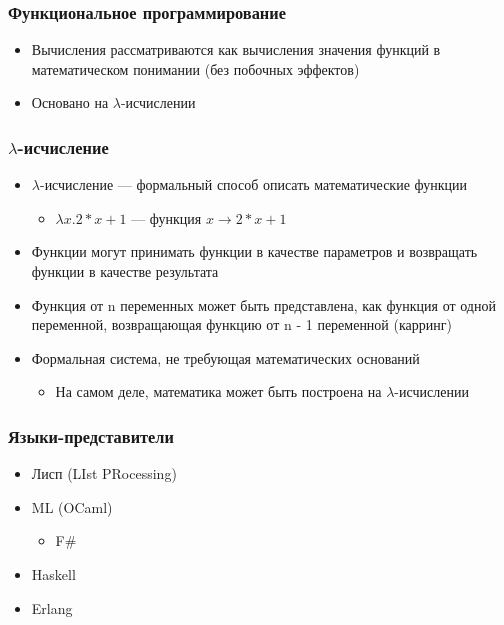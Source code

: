 \documentclass[xetex,mathserif,serif]{beamer}
\begin{document}
    \begin{frame}
        \frametitle{Функциональное программирование}
        \begin{itemize}
            \item Вычисления рассматриваются как вычисления значения функций в математическом понимании (без побочных эффектов)
            \item Основано на $\lambda$-исчислении
        \end{itemize}
    \end{frame}

    \begin{frame}
        \frametitle{$\lambda$-исчисление}
        \begin{itemize}
            \item $\lambda$-исчисление --- формальный способ описать математические функции
            \begin{itemize}
                \item $\lambda{x}.2 * x + 1$ --- функция $x \rightarrow 2 * x + 1$
            \end{itemize}
            \item Функции могут принимать функции в качестве параметров и возвращать функции в качестве результата
            \item Функция от n переменных может быть представлена, как функция от одной переменной, возвращающая функцию от n - 1 переменной (карринг)
            \item Формальная система, не требующая математических оснований
            \begin{itemize}
                \item На самом деле, математика может быть построена на $\lambda$-исчислении
            \end{itemize}
        \end{itemize}
    \end{frame}

    \begin{frame}
        \frametitle{Языки-представители}
        \begin{itemize}
            \item Лисп (LIst PRocessing)
            \item ML (OCaml)
            \begin{itemize}
                \item F\#
            \end{itemize}
            \item Haskell
            \item Erlang
        \end{itemize}
    \end{frame}
\end{document}
